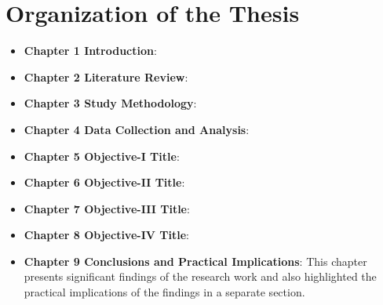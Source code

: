 \documentclass{article}
\begin{document}
\section{Organization of the Thesis}
    \begin{itemize}
        \item \textbf{Chapter 1 Introduction}: \lipsum[2]
      
        \item  \textbf{Chapter 2 Literature Review}:
        \lipsum[1-2]

        \item \textbf{Chapter 3 Study Methodology}: \lipsum[1-2]
        
        \item \textbf{Chapter 4 Data Collection and Analysis}: \lipsum[5-6]
       
        \item \textbf{Chapter 5 Objective-I Title}: 
        \lipsum[5-6]
        
        \item \textbf{Chapter 6 Objective-II Title}: 
        \lipsum[1]
        
        \item \textbf{Chapter 7 Objective-III Title}: \lipsum[1-2]
        
        \item \textbf{Chapter 8 Objective-IV Title}: \lipsum[1-2]
        
        \item \textbf{Chapter 9 Conclusions and Practical Implications}: This chapter presents significant findings of the research work and also highlighted the practical implications of the findings in a separate section.
    \end{itemize}
    
    
%


\end{document}
